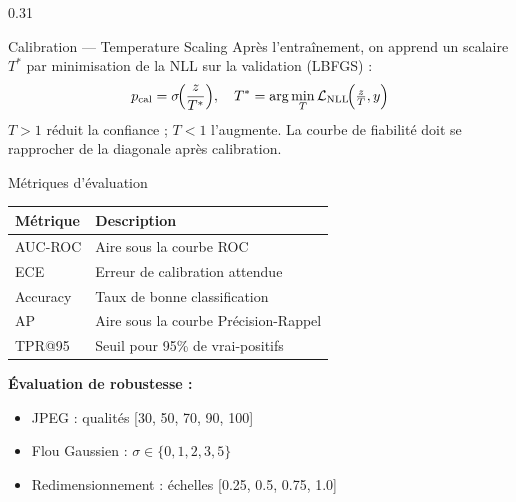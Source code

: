 \documentclass[final]{beamer}
\begin{document}
\begin{frame}[t]
\begin{columns}[t]
\begin{column}{0.31\linewidth}
\vspace{0.4cm}

\begin{block}{Calibration — Temperature Scaling}
Après l'entraînement, on apprend un scalaire $T^*$ par minimisation de la NLL
sur la validation (LBFGS) :
$$p_{\text{cal}} = \sigma\!\Bigl(\frac{z}{T^*}\Bigr), \quad T^* = \arg\min_T \mathcal{L}_{\text{NLL}}\!\Bigl(\tfrac{z}{T}, y\Bigr)$$
$T>1$ réduit la confiance ; $T<1$ l'augmente. La courbe de fiabilité
doit se rapprocher de la diagonale après calibration.
\end{block}

\vspace{0.4cm}

\begin{block}{Métriques d'évaluation}
\begin{center}
\small
\begin{tabular}{@{}ll@{}}
\toprule
\textbf{Métrique} & \textbf{Description}\\
\midrule
AUC-ROC & Aire sous la courbe ROC\\
ECE & Erreur de calibration attendue\\
Accuracy & Taux de bonne classification\\
AP & Aire sous la courbe Précision-Rappel\\
TPR@95 & Seuil pour 95\% de vrai-positifs\\
\bottomrule
\end{tabular}
\end{center}

\vspace{6pt}
\textbf{Évaluation de robustesse :}
\begin{itemize}[leftmargin=1.2em, itemsep=2pt]
  \item JPEG : qualités [30, 50, 70, 90, 100]
  \item Flou Gaussien : $\sigma \in \{0, 1, 2, 3, 5\}$
  \item Redimensionnement : échelles [0.25, 0.5, 0.75, 1.0]
\end{itemize}
\end{block}

\end{column}
\end{columns}

\vspace{0.6cm}

\begin{columns}[t]


\end{columns}
\end{frame}
\end{document}
